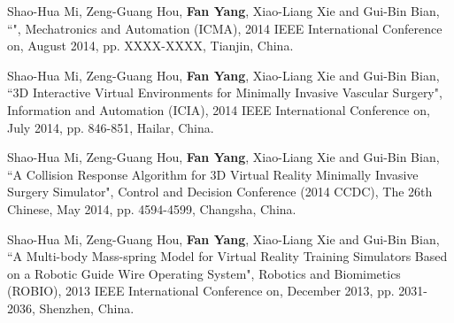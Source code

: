 \begin{publications}{99}
\item Shao-Hua Mi, Zeng-Guang Hou, \textbf{Fan Yang}, Xiao-Liang Xie and Gui-Bin Bian, ``", Mechatronics and Automation (ICMA), 2014 IEEE International Conference on, August 2014, pp. XXXX-XXXX, Tianjin, China.%

\item Shao-Hua Mi, Zeng-Guang Hou, \textbf{Fan Yang}, Xiao-Liang Xie and Gui-Bin Bian, ``3D Interactive Virtual Environments for Minimally Invasive Vascular Surgery", Information and Automation (ICIA), 2014 IEEE International Conference on, July 2014, pp. 846-851, Hailar, China.%

\item Shao-Hua Mi, Zeng-Guang Hou, \textbf{Fan Yang}, Xiao-Liang Xie and Gui-Bin Bian, ``A Collision Response Algorithm for 3D Virtual Reality Minimally Invasive Surgery Simulator", Control and Decision Conference (2014 CCDC), The 26th Chinese, May 2014, pp. 4594-4599, Changsha, China.%

\item Shao-Hua Mi, Zeng-Guang Hou, \textbf{Fan Yang}, Xiao-Liang Xie and Gui-Bin Bian, ``A Multi-body Mass-spring Model for Virtual Reality Training Simulators Based on a Robotic Guide Wire Operating System", Robotics and Biomimetics (ROBIO), 2013 IEEE International Conference on, December 2013, pp. 2031-2036, Shenzhen, China.%

\end{publications}

